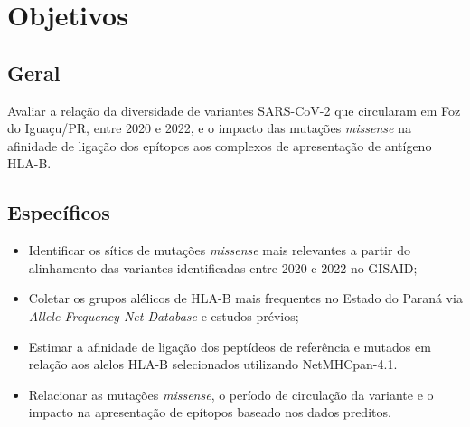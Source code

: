 \chapter{Objetivos}

\begin{justify}

\section{Geral}

\hspace{12 mm}Avaliar a relação da diversidade de variantes SARS-CoV-2 que circularam em Foz do Iguaçu/PR, entre 2020 e 2022, e o impacto das mutações \textit{missense} na afinidade de ligação dos epítopos aos complexos de apresentação de antígeno HLA-B. 

\section{Específicos}

\begin{itemize}
    \item Identificar os sítios de mutações \textit{missense} mais relevantes a partir do alinhamento das variantes identificadas entre 2020 e 2022 no GISAID;

    \item Coletar os grupos alélicos de HLA-B mais frequentes no Estado do Paraná via \textit{Allele Frequency Net Database} e estudos prévios;

    \item Estimar a afinidade de ligação dos peptídeos de referência e mutados em relação aos alelos HLA-B selecionados utilizando NetMHCpan-4.1.

    \item Relacionar as mutações \textit{missense}, o período de circulação da variante e o impacto na apresentação de epítopos baseado nos dados preditos.
\end{itemize}

\end{justify}